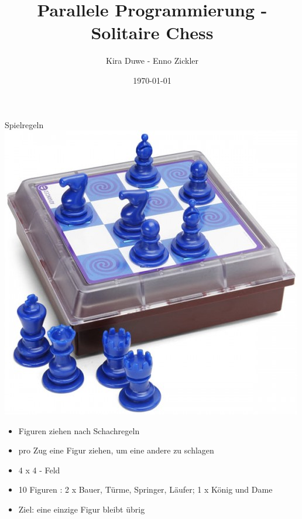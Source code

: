 \documentclass{beamer}
\title{Parallele Programmierung - Solitaire Chess}
\author{Kira Duwe - Enno Zickler}
\institute{DKRZ- UHH}
\date{\today}
\begin{document}
\begin{frame}
\titlepage
\end{frame}


\begin{frame}{Spielregeln}
\includegraphics[scale=0.2]{solitaire}
\begin{itemize}

	\item Figuren ziehen nach Schachregeln
	\item pro Zug eine Figur ziehen, um eine andere zu schlagen
	\item 4 x 4 - Feld
	\item 10 Figuren : 2 x Bauer, Türme, Springer, Läufer; 1 x König und Dame
	\item Ziel: eine einzige Figur bleibt übrig

\end{itemize}
\end{frame}
\end{document}
